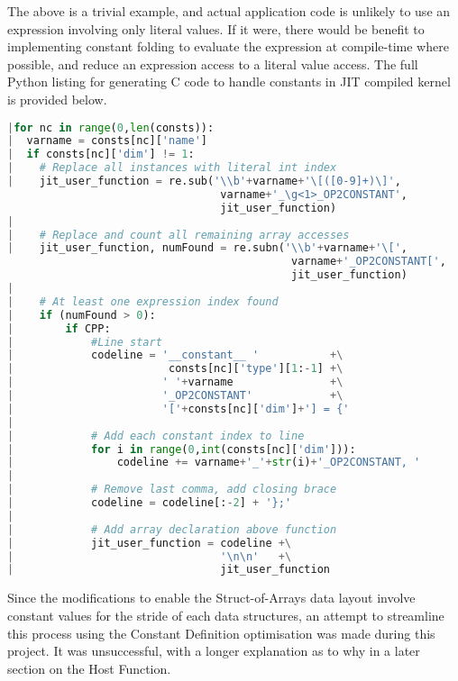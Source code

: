 \noindent The above is a trivial example, and actual application code is unlikely to use an expression involving only literal values. If it were, there would be benefit to implementing constant folding \cite{constFold} to evaluate the expression at compile-time where possible, and reduce an expression access to a literal value access.
\clearpage
\noindent The full Python listing for generating C code to handle constants in JIT compiled kernel is provided below.
\begin{lstlisting}[backgroundcolor = \color{lightgray!20}, language=Python]
|for nc in range(0,len(consts)):
|  varname = consts[nc]['name']
|  if consts[nc]['dim'] != 1:
|    # Replace all instances with literal int index
|    jit_user_function = re.sub('\\b'+varname+'\[([0-9]+)\]',
                                 varname+'_\g<1>_OP2CONSTANT',
                                 jit_user_function)
|
|    # Replace and count all remaining array accesses
|    jit_user_function, numFound = re.subn('\\b'+varname+'\[',
                                            varname+'_OP2CONSTANT[',
                                            jit_user_function)
|
|    # At least one expression index found
|    if (numFound > 0):
|        if CPP:
|            #Line start
|            codeline = '__constant__ '           +\
|                        consts[nc]['type'][1:-1] +\
|                       ' '+varname               +\
|                       '_OP2CONSTANT'            +\
|                       '['+consts[nc]['dim']+'] = {'
|
|            # Add each constant index to line
|            for i in range(0,int(consts[nc]['dim'])):
|                codeline += varname+'_'+str(i)+'_OP2CONSTANT, '
|
|            # Remove last comma, add closing brace
|            codeline = codeline[:-2] + '};'
|
|            # Add array declaration above function
|            jit_user_function = codeline +\
|                                '\n\n'   +\
|                                jit_user_function
\end{lstlisting}

\tinytitle{SoA optimisation:}
Since the modifications to enable the Struct-of-Arrays data layout involve constant values for the stride of each data structures, an attempt to streamline this process using the Constant Definition optimisation was made during this project. It was unsuccessful, with a longer explanation as to why in a later section on the Host Function.
\par


